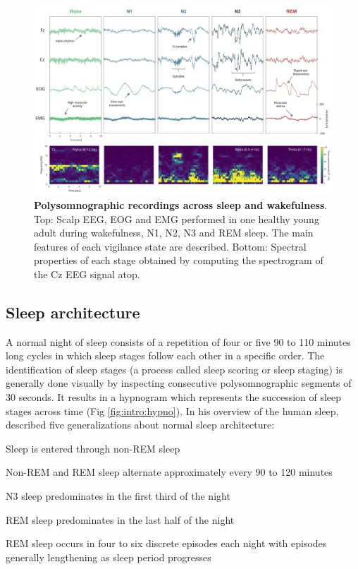 \begin{figure}
	\centering
	\includegraphics[width=\linewidth, height=0.8\textheight, keepaspectratio]{Fig/Intro/Intro_Sleep_Stages_PSD/Intro_Sleep_Stages_PSD.png}
	\captionsetup{width=0.9\textheight}
	\caption[Polysomnographic recordings across sleep and wakefulness]{\textbf{Polysomnographic recordings across sleep and wakefulness}. Top: Scalp EEG, EOG and EMG performed in one healthy young adult during wakefulness, N1, N2, N3 and REM sleep. The main features of each vigilance state are described. Bottom: Spectral properties of each stage obtained by computing the spectrogram of the Cz EEG signal atop.}
	\label{fig:intro:sleep_stage}
\end{figure}

\subsection{Sleep architecture}
\label{sec:dream-research:sleep:architecture}

A normal night of sleep consists of a repetition of four or five 90 to 110 minutes long cycles in which sleep stages follow each other in a specific order. The identification of sleep stages (a process called sleep scoring or sleep staging) is generally done visually by inspecting consecutive polysomnographic segments of 30 seconds. It results in a hypnogram which represents the succession of sleep stages across time (Fig \ref{fig:intro:hypno}). In his overview of the human sleep, \citet{hirshkowitz_normal_2004} described five generalizations about normal sleep architecture:

\begin{my_list_num}
    \item Sleep is entered through non-REM sleep
    \item Non-REM and REM sleep alternate approximately every 90 to 120 minutes
	\item N3 sleep predominates in the first third of the night
	\item REM sleep predominates in the last half of the night
	\item REM sleep occurs in four to six discrete episodes each night with episodes generally lengthening as sleep period progresses
\end{my_list_num}


